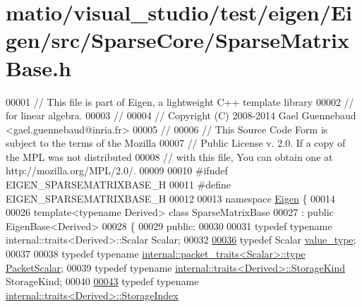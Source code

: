 \hypertarget{matio_2visual__studio_2test_2eigen_2_eigen_2src_2_sparse_core_2_sparse_matrix_base_8h_source}{}\section{matio/visual\+\_\+studio/test/eigen/\+Eigen/src/\+Sparse\+Core/\+Sparse\+Matrix\+Base.h}
\label{matio_2visual__studio_2test_2eigen_2_eigen_2src_2_sparse_core_2_sparse_matrix_base_8h_source}

\begin{DoxyCode}
00001 \textcolor{comment}{// This file is part of Eigen, a lightweight C++ template library}
00002 \textcolor{comment}{// for linear algebra.}
00003 \textcolor{comment}{//}
00004 \textcolor{comment}{// Copyright (C) 2008-2014 Gael Guennebaud <gael.guennebaud@inria.fr>}
00005 \textcolor{comment}{//}
00006 \textcolor{comment}{// This Source Code Form is subject to the terms of the Mozilla}
00007 \textcolor{comment}{// Public License v. 2.0. If a copy of the MPL was not distributed}
00008 \textcolor{comment}{// with this file, You can obtain one at http://mozilla.org/MPL/2.0/.}
00009 
00010 \textcolor{preprocessor}{#ifndef EIGEN\_SPARSEMATRIXBASE\_H}
00011 \textcolor{preprocessor}{#define EIGEN\_SPARSEMATRIXBASE\_H}
00012 
00013 \textcolor{keyword}{namespace }\hyperlink{namespace_eigen}{Eigen} \{ 
00014 
00026 \textcolor{keyword}{template}<\textcolor{keyword}{typename} Derived> \textcolor{keyword}{class }SparseMatrixBase
00027   : \textcolor{keyword}{public} EigenBase<Derived>
00028 \{
00029   \textcolor{keyword}{public}:
00030 
00031     \textcolor{keyword}{typedef} \textcolor{keyword}{typename} internal::traits<Derived>::Scalar Scalar;
00032     
\hyperlink{group___sparse_core___module_ac254d3b61718ebc2136d27bac043dcb7}{00036}     \textcolor{keyword}{typedef} Scalar \hyperlink{group___sparse_core___module_ac254d3b61718ebc2136d27bac043dcb7}{value\_type};
00037     
00038     \textcolor{keyword}{typedef} \textcolor{keyword}{typename} \hyperlink{group___sparse_core___module}{internal::packet\_traits<Scalar>::type} 
      \hyperlink{group___sparse_core___module}{PacketScalar};
00039     \textcolor{keyword}{typedef} \textcolor{keyword}{typename} \hyperlink{struct_eigen_1_1internal_1_1traits}{internal::traits<Derived>::StorageKind} 
      StorageKind;
00040 
\hyperlink{group___sparse_core___module_a0b540ba724726ebe953f8c0df06081ed}{00043}     \textcolor{keyword}{typedef} \textcolor{keyword}{typename} \hyperlink{struct_eigen_1_1internal_1_1traits}{internal::traits<Derived>::StorageIndex} 

\end{DoxyCode}
